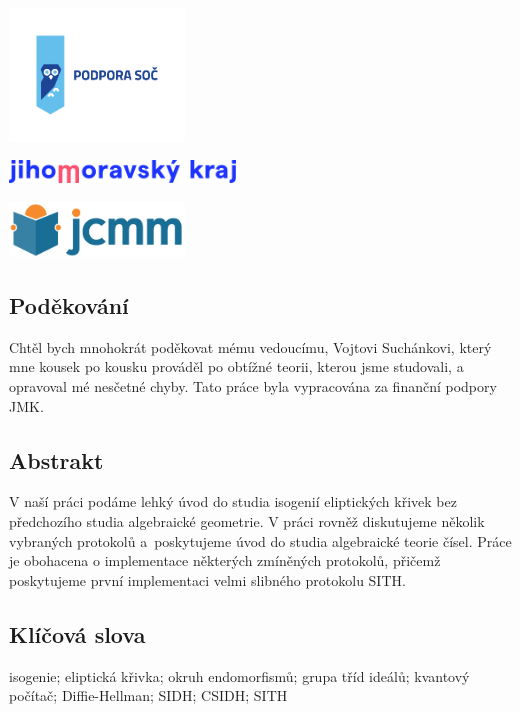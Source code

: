 \documentclass[12pt]{report}
\begin{document}
\newpage
\thispagestyle{empty}
\begin{center}
\includegraphics[width=0.35\textwidth]{podpora_soc-horizontalni.png}
\end{center}
\vspace*{1.5cm}
\begin{center}
\includegraphics[width=0.45\textwidth]{logo_JMK_pruhledne.png}
\end{center}
\vspace*{2.2cm}
\begin{center}
\includegraphics[width=0.35\textwidth]{jcmm-logotype-positive1.png}
\end{center}
\vspace*{6.5cm}
\subsection*{Poděkování}
Chtěl bych mnohokrát poděkovat mému vedoucímu, Vojtovi Suchánkovi, který mne kousek po kousku prováděl po obtížné teorii, kterou jsme studovali, a opravoval mé nesčetné chyby. Tato práce byla vypracována za finanční podpory JMK.


\newpage
\thispagestyle{empty}
\subsection*{Abstrakt}
V naší práci podáme lehký úvod do studia isogenií eliptických křivek bez předchozího studia algebraické geometrie. V práci rovněž diskutujeme několik vybraných protokolů a~poskytujeme úvod do studia algebraické teorie čísel. Práce je obohacena o implementace některých zmíněných protokolů, přičemž poskytujeme první implementaci velmi slibného protokolu SITH.


\subsection*{Klíčová slova}
isogenie; eliptická křivka; okruh endomorfismů; grupa tříd ideálů; kvantový počítač; Diffie-Hellman; SIDH; CSIDH; SITH
\end{document}
